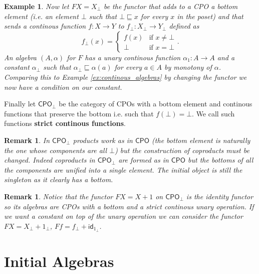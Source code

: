 \documentclass[letterpaper, 11pt, oneside]{memoir}
\theoremstyle{myteo}
\newtheorem{example}[theorem]{Example}
\newtheorem{remark}[theorem]{Remark}
\numberwithin{equation}{section}
\newcommand{\marginnote}[1]{\marginpar{\footnotesize #1}}
\newcommand{\id}{\textsf{id}}
\newcommand{\CPO}{\textsf{CPO}}
\begin{document}
\begin{example}
  Now let \(FX = X_\bot\) be the functor that adds to a CPO a bottom element (i.e. an element \(\bot\) such that \(\bot \sqsubseteq x\) for every \(x\) in the poset) and that sends a continous function \(f \colon X \to Y\) to \(f_\bot \colon X_\bot \to Y_\bot\) defined as
  \begin{equation*}
    f_\bot(x) = \begin{cases}
      f(x) & \text{if \(x \neq \bot\)}\\
      \bot & \text{if \(x = \bot\)}
    \end{cases}.
  \end{equation*}
  An algebra \((A, \alpha)\) for \(F\) has a unary continous function \(\alpha_1 \colon A \to A\) and a constant \(\alpha_\bot\) such that \(\alpha_\bot \sqsubseteq \alpha(a)\) for every \(a \in A\) by monotony of \(\alpha\).
  Comparing this to Example \ref{ex:continous_algebras} by changing the functor we now have a condition on our constant.
\end{example}

Finally let \(\CPO_\bot\) be the category of CPOs with a bottom element and continous functions that preserve the bottom i.e. such that \(f(\bot) = \bot\).
\marginnote{strict continous function}
We call such functions \textbf{strict continous functions}.

\begin{remark}
  In \(\CPO_\bot\) products work as in \(\CPO\) (the bottom element is naturally the one whose components are all \(\bot\)) but the construction of coproducts must be changed.
  Indeed coproducts in \(\CPO_\bot\) are formed as in \(\CPO\) but the bottoms of all the components are unified into a single element.
  The initial object is still the singleton as it clearly has a bottom.
\end{remark}

\begin{remark}
  Notice that the functor \(FX = X + 1\) on \(\CPO_\bot\) is the identity functor so its algebras are CPOs with a bottom and a strict continous unary operation.
  If we want a constant on top of the unary operation we can consider the functor \(FX = X_\bot + 1_\bot\), \(Ff = f_\bot + \id_{1_\bot}\).
\end{remark}

\section{Initial Algebras}
\end{document}
